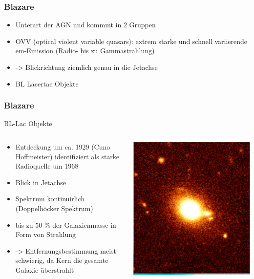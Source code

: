 \documentclass[aspectratio=1610, 9pt]{beamer}
\begin{document}
\begin{frame}\frametitle{Blazare}
  \begin{itemize}
    \item Unterart der AGN und kommmt in 2 Gruppen
    \item OVV (optical violent variable quasars): extrem starke und schnell variierende em-Emission (Radio- bis zu Gammastrahlung)
    \item -> Blickrichtung ziemlich genau in die Jetachse
    \item BL Lacertae Objekte
  \end{itemize}
\end{frame}

\begin{frame}\frametitle{Blazare}
  \begin{block}{BL-Lac Objekte}
  \begin{columns}
  \begin{column}[c]{0.45\linewidth}
    \begin{itemize}
      \item Entdeckung um ca. 1929 (Cuno Hoffmeister) identifiziert als starke Radioquelle um 1968
      \item Blick in Jetachse
      \item Spektrum kontinuirlich (Doppelh\"ocker Spektrum)
      \item bis zu 50 \% der Galaxienmasse in Form von Strahlung
      \item -> Entfernungsbestimmung meist schwierig, da Kern die gesamte Galaxie \"uberstrahlt
    \end{itemize}
    \end{column}
    \begin{column}[c]{0.45\linewidth}
      \includegraphics{images/bl-lac-object.png}

\end{column}
\end{columns}
\end{block}
\end{frame}
\end{document}
